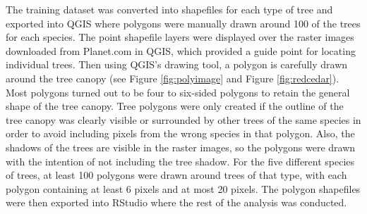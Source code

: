 \documentclass[12pt,twoside]{reedthesis}
\begin{document}
The training dataset was converted into shapefiles for each type of tree and exported into QGIS where polygons were manually drawn around 100 of the trees for each species. The point shapefile layers were displayed over the raster images downloaded from Planet.com in QGIS, which provided a guide point for locating individual trees. Then using QGIS's drawing tool, a polygon is carefully drawn around the tree canopy (see Figure \ref{fig:polyimage} and Figure \ref{fig:redcedar}). Most polygons turned out to be four to six-sided polygons to retain the general shape of the tree canopy. Tree polygons were only created if the outline of the tree canopy was clearly visible or surrounded by other trees of the same species in order to avoid including pixels from the wrong species in that polygon. Also, the shadows of the trees are visible in the raster images, so the polygons were drawn with the intention of not including the tree shadow. For the five different species of trees, at least 100 polygons were drawn around trees of that type, with each polygon containing at least 6 pixels and at most 20 pixels. The polygon shapefiles were then exported into RStudio where the rest of the analysis was conducted.
\end{document}
